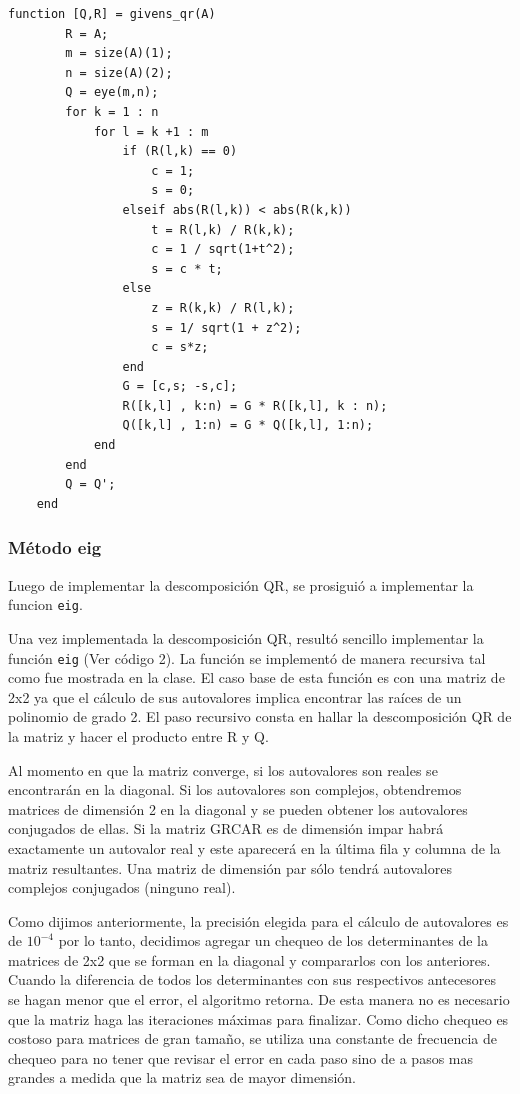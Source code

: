 \documentclass[a4paper,10pt,spanish]{article}
\begin{document}
\begin{lstlisting}[caption = Implementación de la descomposición QR con GS]
	function [Q,R] = givens_qr(A)
		R = A;
		m = size(A)(1);
		n = size(A)(2);
		Q = eye(m,n);
		for k = 1 : n
			for l = k +1 : m
				if (R(l,k) == 0)
					c = 1;
					s = 0;
				elseif abs(R(l,k)) < abs(R(k,k))
					t = R(l,k) / R(k,k);
					c = 1 / sqrt(1+t^2);
					s = c * t;
				else
					z = R(k,k) / R(l,k);
					s = 1/ sqrt(1 + z^2);
					c = s*z;
				end
				G = [c,s; -s,c];
				R([k,l] , k:n) = G * R([k,l], k : n);
				Q([k,l] , 1:n) = G * Q([k,l], 1:n);
			end
		end
		Q = Q';
	end
\end{lstlisting}




\subsubsection{Método eig}

Luego de implementar la descomposición QR, se prosiguió a implementar la funcion \texttt{eig}. 

Una vez implementada la descomposición QR, resultó sencillo implementar la función \texttt{eig} (Ver código 2). La función se implementó de manera recursiva tal como fue mostrada en la clase. El caso base de esta función es con una matriz de 2x2 ya que el cálculo de sus autovalores implica encontrar las raíces de un polinomio de grado 2. El paso recursivo consta en hallar la descomposición QR de la matriz  y hacer el producto entre R y Q.

Al momento en que la matriz converge, si los autovalores son reales se encontrarán en la diagonal. Si los autovalores son complejos, obtendremos matrices de dimensión 2 en la diagonal y se pueden obtener los autovalores conjugados de ellas. Si la matriz GRCAR es de dimensión impar habrá exactamente un autovalor real y este aparecerá en la última fila y columna de la matriz resultantes. Una matriz de dimensión par sólo tendrá autovalores complejos conjugados (ninguno real).

Como dijimos anteriormente, la precisión elegida para el cálculo de autovalores es de $10^{-4}$ por lo tanto, decidimos agregar un chequeo de los determinantes de la matrices de 2x2 que se forman en la diagonal y compararlos con los anteriores. Cuando la diferencia de todos los determinantes con sus respectivos antecesores se hagan menor que el error, el algoritmo retorna. De esta manera no es necesario que la matriz haga las iteraciones máximas para finalizar. Como dicho chequeo es costoso para matrices de gran tamaño, se utiliza una constante de frecuencia de chequeo para no tener que revisar el error en cada paso sino de a pasos mas grandes a medida que la matriz sea de mayor dimensión.
\end{document}
